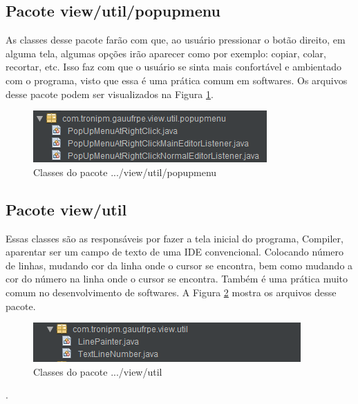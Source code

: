 \documentclass{bcc}
\begin{document}
\subsection{Pacote view/util/popupmenu}
As classes desse pacote farão com que, ao usuário pressionar o botão direito, em alguma tela, algumas opções irão aparecer como por exemplo: copiar, colar, recortar, etc. Isso faz com que o usuário se sinta mais confortável e ambientado com o programa, visto que essa é uma prática comum em softwares. Os arquivos desse pacote podem ser visualizados na Figura \ref{fig:pacotePopupmenu}.
\begin{figure}[H]
\centering
\includegraphics[width=.6\textwidth]{Figuras/pacote_popupmenu.png}
\caption{Classes do pacote .../view/util/popupmenu}
\label{fig:pacotePopupmenu}
\end{figure}

\subsection{Pacote view/util}
Essas classes são as responsáveis por fazer a tela inicial do programa, Compiler, aparentar ser um campo de texto de uma IDE convencional. Colocando número de linhas, mudando cor da linha onde o cursor se encontra, bem como mudando a cor do número na linha onde o cursor se encontra. Também é uma prática muito comum no desenvolvimento de softwares. A Figura \ref{fig:pacoteViewUtil} mostra os arquivos desse pacote.
\begin{figure}[H]
\centering
\includegraphics[width=.6\textwidth]{Figuras/pacote_view_util.png}
\caption{Classes do pacote .../view/util}
\label{fig:pacoteViewUtil}
\end{figure}.
\end{document}
